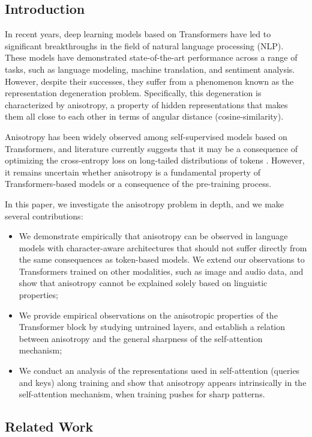 \subsection{Introduction}
In recent years, deep learning models based on Transformers have led to significant breakthroughs in the field of natural language processing (NLP). These models have demonstrated state-of-the-art performance across a range of tasks, such as language modeling, machine translation, and sentiment analysis. However, despite their successes, they suffer from a phenomenon known as the representation degeneration problem. Specifically, this degeneration is characterized by anisotropy, a property of hidden representations that makes them all close to each other in terms of angular distance (cosine-similarity).

Anisotropy has been widely observed among self-supervised models based on Transformers, and literature currently suggests that it may be a consequence of optimizing the cross-entropy loss on long-tailed distributions of tokens \citep{gao2018representation, bis-etal-2021-much}. However, it remains uncertain whether anisotropy is a fundamental property of Transformers-based models or a consequence of the pre-training process.

In this paper, we investigate the anisotropy problem in depth, and we make several contributions:
\begin{itemize}
    \item We demonstrate empirically that anisotropy can be observed in language models with character-aware architectures that should not suffer directly from the same consequences as token-based models. We extend our observations to Transformers trained on other modalities, such as image and audio data, and show that anisotropy cannot be explained solely based on linguistic properties;
    \item We provide empirical observations on the anisotropic properties of the Transformer block by studying untrained layers, and establish a relation between anisotropy and the general sharpness of the self-attention mechanism;
    \item We conduct an analysis of the representations used in self-attention (queries and keys) along training and show that anisotropy appears intrinsically in the self-attention mechanism, when training pushes for sharp patterns.
\end{itemize} 

\subsection{Related Work}


